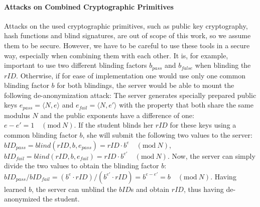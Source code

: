 \paragraph{Attacks on Combined Cryptographic Primitives}
Attacks on the used cryptographic primitives, such as public key
cryptography, hash functions and blind signatures, are out
of scope of this work, so we assume them to be secure. However, we have
to be careful to use these tools in a secure way, especially when
combining them with each other. It is, for example, important to use two
different blinding factors $b_{pass}$ and $b_{false}$ when blinding the
$rID$.  Otherwise, if for ease of implementation one would use only one
common blinding factor $b$ for both blindings, the server would be able
to mount the following de-anonymization attack: 
%
\newcommand{\modn}{\ensuremath{\quad(\mathrm{mod}\ N)}}
The server generates specially prepared public keys $e_{pass} = \langle
N,e \rangle$ and $e_{fail} = \langle N,e' \rangle$ with the property
that both share the same modulus $N$ and the public exponents have a
difference of one: $e - e' = 1 \modn$.
If the student blinds her $rID$ for these keys using a common blinding
factor $b$, she will submit the following two values to the server:
$bID_{pass} = blind(rID,b,e_{pass}) = rID \cdot b^{e} \modn$,
$bID_{fail} = blind(rID,b,e_{fail}) = rID \cdot b^{e'} \modn$.
Now, the server can simply divide the two values to obtain the blinding
factor $b$:
$bID_{pass} / bID_{fail} = (b^{e}\cdot rID) / (b^{e'}\cdot rID) =
b^{e-e'} = b \modn$.
Having learned $b$, the server can unblind the $bID$s and obtain $rID$,
thus having de-anonymized the student.





